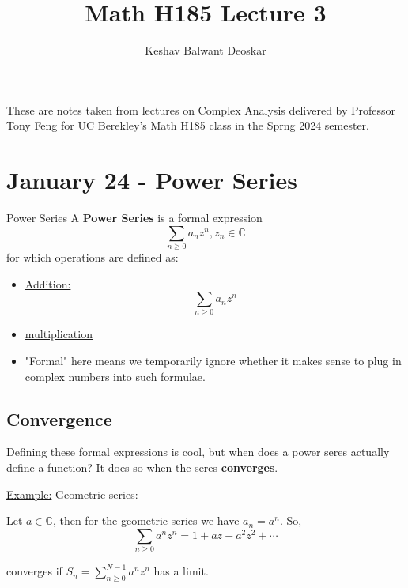 \documentclass{article}
\title{Math H185 Lecture 3}
\author{Keshav Balwant Deoskar}
\newcommand{\C}{\mathbb{C}}
\begin{document}
\maketitle

These are notes taken from lectures on Complex Analysis delivered by Professor Tony Feng for UC Berekley's Math H185 class in the Sprng 2024 semester.

\tableofcontents

\pagebreak

\section{January 24 - Power Series}

\vskip 1cm
\begin{mathdefinitionbox}{Power Series}
  A \textbf{Power Series} is a formal expression
  \[ \sum_{n \geq 0} a_n z^{n}, z_n \in \C \]
  for which operations are defined as:

  \begin{itemize}
    \item \underline{Addition:} 
    \[  \sum_{n \geq 0} a_n z^{n} \]
    \item \underline{multiplication}
  \end{itemize}
\end{mathdefinitionbox}

\begin{itemize}
  \item "Formal" here means we temporarily ignore whether it makes sense to plug in complex numbers into such formulae.
\end{itemize}

\vskip 1cm
\subsection{Convergence}
Defining these formal expressions is cool, but when does a power seres actually define a function? It does so when the seres \textbf{converges}.

\vskip 0.5cm
\underline{Example:} Geometric series:

Let $a \in \C$, then for the geometric series we have $a_n = a^n$. So, 
\[ \sum_{n \geq 0} a^n z^n = 1 + az +  a^2z^2 + \cdots \]

converges if $S_n = \sum_{n \geq 0}^{N-1} a^n z^n$ has a limit.
\end{document}
